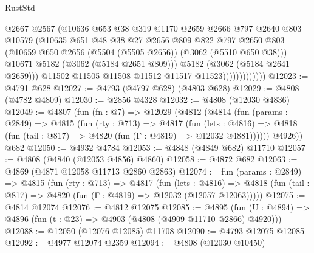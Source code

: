 \begin{lexlean}{RustStd}
\begin{coremodule}
                              @2667
                              @2567
                              (@10636
                                @653
                                @38
                                @319
                                @1170
                                @2659
                                @2666
                                @797
                                @2640
                                @803
                                @10579
                                (@10635
                                  @651
                                  @48
                                  @38
                                  @27
                                  @2656
                                  @809
                                  @822
                                  @797
                                  @2650
                                  @803
                                  (@10659 @650 @2656 (@5504 (@5505 @2656)) (@3062 (@5510 @650 @38)))
                                  @10671
                                  @5182
                                  (@3062 (@5184 @2651 @809)))
                                @5182
                                (@3062 (@5184 @2641 @2659)))
                              @11502
                              @11505
                              @11508
                              @11512
                              @11517
                              @11523)))))))))))))
@12023 := @4791 @628
@12027 := @4793 (@4797 @628) (@4803 @628)
@12029 := @4808 (@4782 @4809)
@12030 := @2856 @4328
@12032 := @4808 (@12030 @4836)
@12049 := @4807
    (fun (fn : @7) =>
    @12029
      (@4812
        (@4814
          (fun (params : @2849) =>
          @4815
            (fun (rty : @713) =>
            @4817
              (fun (lets : @4816) =>
              @4818 (fun (tail : @817) => @4820 (fun (Γ : @4819) => @12032 @4881))))))
        @4926))
    @682
@12050 := @4932 @4784
@12053 := @4848 (@4849 @682) @11710
@12057 := @4808 (@4840 (@12053 @4856) @4860)
@12058 := @4872 @682
@12063 := @4869 (@4871 @12058 @11713 @2860 @2863)
@12074 := fun (params : @2849) =>
  @4815
    (fun (rty : @713) =>
    @4817
      (fun (lets : @4816) =>
      @4818 (fun (tail : @817) => @4820 (fun (Γ : @4819) => @12032 (@12057 @12063)))))
@12075 := @4814 @12074
@12076 := @4812 @12075
@12085 := @4895
    (fun (U : @4894) => @4896 (fun (t : @23) => @4903 (@4808 (@4909 @11710 @2866) @4920)))
@12088 := @12050 (@12076 @12085) @11708
@12090 := @4793 @12075 @12085
@12092 := @4977 @12074 @2359
@12094 := @4808 (@12030 @10450)

\end{coremodule}
\end{lexlean}

